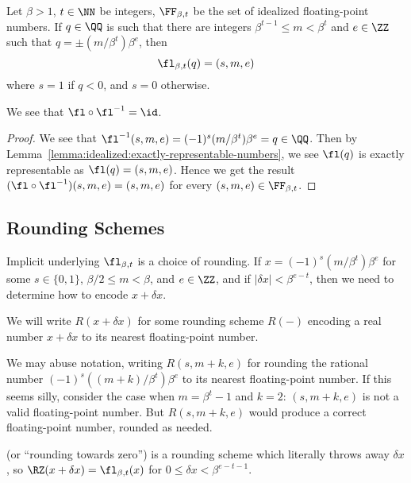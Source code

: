 \begin{lemma}\label{lemma:idealized:exactly-representable-numbers}
  Let $\beta>1$, $t\in\NN$ be integers, $\FF_{\beta,t}$ be the set of
  idealized floating-point numbers.
  If $q\in\QQ$ is such that there are integers $\beta^{t-1}\leq m<\beta^{t}$
  and $e\in\ZZ$ such that $q=\pm (m/\beta^{t})\beta^{e}$, then
  \begin{equation*}
    \fl_{\beta,t}(q) = (s,m,e)
  \end{equation*}
  where $s=1$ if $q<0$, and $s=0$ otherwise.
\end{lemma}

\begin{thm}
  We see that $\fl\circ\fl^{-1}=\id$.
\end{thm}
\begin{proof}
  We see that $\fl^{-1}(s,m,e)=(-1)^{s}(m/\beta^{t})\beta^{e}=q\in\QQ$. Then by
  Lemma~\ref{lemma:idealized:exactly-representable-numbers}, we see
  $\fl(q)$ is exactly representable as $\fl(q)=(s,m,e)$. Hence we get
  the result $(\fl\circ\fl^{-1})(s,m,e)=(s,m,e)$ for every
  $(s,m,e)\in\FF_{\beta,t}$.
\end{proof}

\subsection{Rounding Schemes}

\begin{rmk}
  Implicit underlying $\fl_{\beta,t}$ is a choice of rounding. If
  $x = (-1)^{s}(m/\beta^{t})\beta^{e}$ for some $s\in\{0,1\}$,
  $\beta/2\leq m<\beta$, and $e\in\ZZ$, and if $|\delta x| < \beta^{e-t}$,
  then we need to determine how to encode $x + \delta x$.

  We will write $R(x+\delta x)$ for some rounding scheme $R(-)$ encoding
  a real number $x+\delta x$ to its nearest floating-point number.
\end{rmk}
\begin{notation}
  We may abuse notation, writing $R(s,m+k,e)$ for rounding the rational
  number $(-1)^{s}((m+k)/\beta^{t})\beta^{e}$ to its nearest
  floating-point number. If this seems silly, consider the case when
  $m=\beta^{t}-1$ and $k=2$: $(s,m+k,e)$ is not a valid floating-point
  number. But $R(s,m+k,e)$ would produce a correct floating-point
  number, rounded as needed.
\end{notation}

\begin{defn}
   (or ``rounding towards zero'') is a rounding
  scheme which literally throws away
  $\delta x$, so
  $\RZ(x+\delta x)=\fl_{\beta,t}(x)$ for $0\leq\delta x<\beta^{e-t-1}$.
\end{defn}

